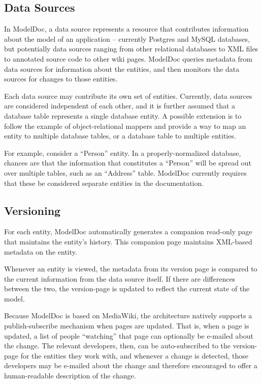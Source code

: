 \documentclass{acm_proc_article-sp}
\begin{document}
\subsection{Data Sources}

In ModelDoc, a data source represents a resource that contributes information
about the model of an application -- currently Postgres and MySQL databases, but
potentially data sources ranging from other relational databases to XML files
to annotated source code to other wiki pages.  ModelDoc queries metadata from
data sources for information about the entities, and then monitors the data
sources for changes to those entities.

Each data source may contribute its own set of entities.  Currently, data
sources are considered independent of each other, and it is further assumed
that a database table represents a single database entity.  A possible
extension is to follow the example of object-relational mappers and provide
a way to map an entity to multiple database tables, or a database table to
multiple entities.

For example, consider a ``Person'' entity.  In a
properly-normalized database, chances are that the information that constitutes a ``Person'' will be spread
out over multiple tables, such as an ``Address'' table.  ModelDoc currently
requires that these be considered separate entities in the documentation.

\subsection{Versioning}

For each entity, ModelDoc automatically generates a companion read-only page
that maintains the entity's history.  This companion page maintains XML-based
metadata on the entity.

Whenever an entity is viewed, the metadata from its version page is compared to
the current information from the data source itself.  If there are differences
between the two, the version-page is updated to reflect the current state of
the model.

Because ModelDoc is based on MediaWiki, the architecture natively supports a
publish-subscribe mechanism when pages are updated.  That is, when a page is
updated, a list of people ``watching'' that page can optionally be e-mailed
about the change.  The relevant developers, then, can be auto-subscribed to the
version-page for the entities they work with, and whenever a change is
detected, those developers may be e-mailed about the change and therefore
encouraged to offer a human-readable description of the change.
\end{document}
